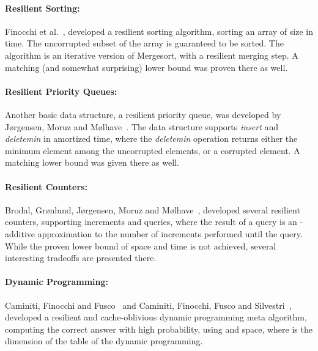 \documentclass{llncs}
\begin{document}
\paragraph{Resilient Sorting:}

	Finocchi et al.~\cite{resilient_data_structures,resilient_sorting},
	developed a resilient sorting algorithm,
	sorting an array of size  in  time.
	The uncorrupted subset of the array is guaranteed to be sorted.
	The algorithm is an iterative version of Mergesort,
	with a resilient merging step.
	A matching (and somewhat surprising) lower bound
	was proven there as well.
	
\paragraph{Resilient Priority Queues:}

	Another basic data structure, a resilient priority queue,
	was developed by J{\o}rgensen, Moruz and M{\o}lhave~\cite{resilient_priority_queues}.
	The data structure supports \emph{insert} and \emph{deletemin} in  amortized time,
	where the \emph{deletemin} operation returns either the minimum element among the uncorrupted elements,
	or a corrupted element.
	A matching lower bound was given there as well.	
		
\paragraph{Resilient Counters:}

	Brodal, Gr{\o}nlund, J{\o}rgensen, Moruz and \linebreak M{\o}lhave~\cite{resilient_counters},
	developed several resilient counters,
	supporting increments and queries,
	where the result of a query is an -additive approximation
	to the number of increments performed until the query.
	While the proven lower bound of  space and time
	is not achieved, several interesting tradeoffs are presented there.

\paragraph{Dynamic Programming:}	
	
	Caminiti, Finocchi and Fusco~\cite{first_dynamic_programming}
	and Caminiti, Finocchi, Fusco and Silvestri~\cite{dynamic_programming},
	developed a resilient and cache-oblivious dynamic programming meta algorithm,
	computing the correct answer with high probability,
	using  and  space,
	where  is the dimension of the table of the dynamic programming.
\end{document}
